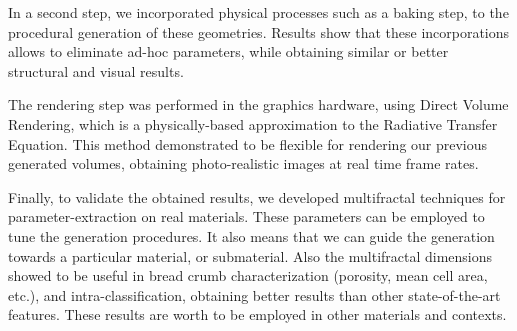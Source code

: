 \documentclass[spanish,a4paper,oneside,10pt,openright]{book}
\begin{document}
In a second step, we incorporated physical processes such as a baking step, to the procedural generation of these geometries.
Results show that these incorporations allows to eliminate ad-hoc parameters, while obtaining similar or better structural and visual results.

The rendering step was performed in the graphics hardware, using Direct Volume Rendering, which is a physically-based approximation to the Radiative Transfer Equation.
This method demonstrated to be flexible for rendering our previous generated volumes, obtaining photo-realistic images at real time frame rates.

Finally, to validate the obtained results, we developed multifractal techniques for parameter-extraction on real materials.
These parameters can be employed to tune the generation procedures.
It also means that we can guide the generation towards a particular material, or submaterial.
Also the multifractal dimensions showed to be useful in bread crumb characterization (porosity, mean cell area, etc.), and intra-classification, obtaining better results than other state-of-the-art features.
These results are worth to be employed in other materials and contexts.

\phantom{p. 1}
\clearpage
\thispagestyle{empty}

\printglossary[type=\acronymtype,style=long3col, title=Acrónimos]

\tableofcontents %

\phantom{p. 1}
\clearpage
\thispagestyle{empty}
\phantom{p. 2}
\clearpage

\cleardoublepage
{} %
\listoffigures %

\phantom{p. 1}
\clearpage
\thispagestyle{empty}
\phantom{p. 2}
\clearpage


\cleardoublepage
{} %
\listoftables %



\newpage


\phantom{p. 1}
\clearpage

 \cleardoublepage

\phantom{p. 1}
\clearpage

 \cleardoublepage

\phantom{p. 1}
\clearpage

 \cleardoublepage

 \cleardoublepage

\phantom{p. 1}
\clearpage
\thispagestyle{empty}
\phantom{p. 2}
\clearpage
 \cleardoublepage
 \cleardoublepage

\phantom{p. 1}
\clearpage
\appendix
 \cleardoublepage



\phantom{p. 1}
\clearpage
\cleardoublepage
{}


\end{document}
